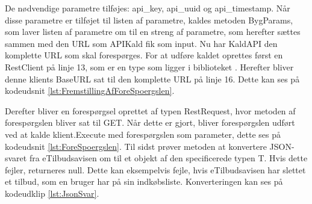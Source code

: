 
De nødvendige parametre tilføjes: api\_key, api\_uuid og api\_timestamp. Når disse parametre er tilføjet til listen af parametre, kaldes metoden BygParams, som laver listen af parametre om til en streng af parametre, som herefter sættes sammen med den URL som APIKald fik som input. Nu har KaldAPI den komplette URL som skal forespørges.
For at udføre kaldet oprettes først en RestClient på linje 13, som er en type som ligger i biblioteket . Herefter bliver denne klients BaseURL sat til den komplette URL på linje 16. Dette kan ses på kodeudsnit \ref{lst:FremstillingAfForeSpoergslen}.


Derefter bliver en forespørgsel oprettet af typen RestRequest, hvor metoden af forespørgslen bliver sat til GET. Når dette er gjort, bliver forespørgslen udført ved at kalde klient.Execute med forespørgslen som parameter, dette ses på kodeudsnit \ref{lst:ForeSpoergslen}. Til sidst prøver metoden at konvertere JSON-svaret fra eTilbudsavisen om til et objekt af den specificerede typen T. Hvis dette fejler, returneres null. Dette kan eksempelvis fejle, hvis eTilbudsavisen har slettet et tilbud, som en bruger har på sin indkøbsliste. Konverteringen kan ses på kodeudklip \ref{lst:JsonSvar}.

